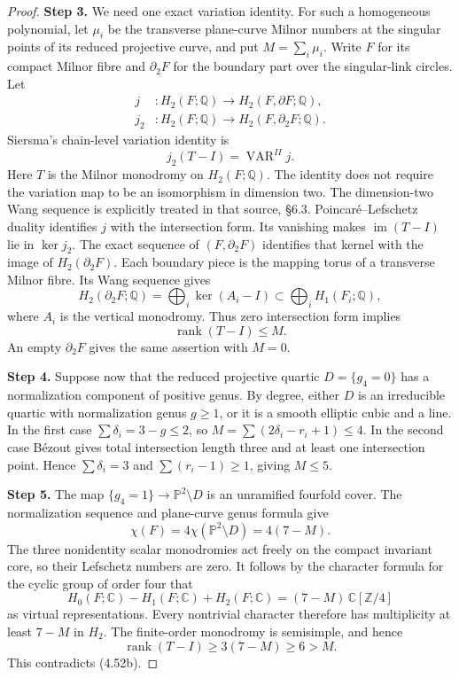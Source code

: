 \begin{proof}
\noindent\textbf{Step 3.} We need one exact variation identity. For such a
homogeneous polynomial, let $\mu_i$ be the
transverse plane-curve Milnor numbers at the
singular points of its reduced projective curve,
and put $M=\sum_i\mu_i$. Write $F$ for its compact
Milnor fibre and $\partial_2F$ for the boundary
part over the singular-link circles. Let
\[
 \begin{split}
 j&:H_2(F;\mathbb Q)\longrightarrow
                         H_2(F,\partial F;\mathbb Q),\\
 j_2&:H_2(F;\mathbb Q)\longrightarrow
                         H_2(F,\partial_2F;\mathbb Q).
 \end{split}
\]
Siersma's chain-level variation identity
\cite[\S3.6, pp.~451--452; \S7.1, p.~462]
{Siersma1991Variation} is
\[
                 j_2(T-I)=\operatorname{VAR}^{II}j.
                                                            \tag{4.52a}
\]
Here $T$ is the Milnor monodromy on $H_2(F;\mathbb Q)$.
The identity does not require the variation map to
be an isomorphism in dimension two. The dimension-two
Wang sequence is explicitly treated in that source,
\S6.3. Poincar\'e--Lefschetz duality identifies $j$
with the intersection form. Its vanishing makes
$\operatorname{im}(T-I)$ lie in $\ker j_2$.
The exact sequence of $(F,\partial_2F)$ identifies
that kernel with the image of $H_2(\partial_2F)$.
Each boundary piece is the mapping torus of a
transverse Milnor fibre. Its Wang sequence gives
\[
 H_2(\partial_2F;\mathbb Q)
       =\bigoplus_i\ker(A_i-I)\subset
                        \bigoplus_iH_1(F_i;\mathbb Q),
\]
where $A_i$ is the vertical monodromy. Thus zero
intersection form implies
\[
                 \operatorname{rank}(T-I)\le M.             \tag{4.52b}
\]
An empty $\partial_2F$ gives the same assertion with
$M=0$.

\noindent\textbf{Step 4.} Suppose now that the reduced projective quartic
$D=\{g_4=0\}$ has a normalization component of
positive genus. By degree, either $D$ is an
irreducible quartic with normalization genus
$g\ge1$, or it is a smooth elliptic cubic and a
line. In the first case
$\sum\delta_i=3-g\le2$, so
$M=\sum(2\delta_i-r_i+1)\le4$.
In the second case B\'ezout gives total intersection
length three and at least one intersection point.
Hence $\sum\delta_i=3$ and
$\sum(r_i-1)\ge1$, giving $M\le5$.

\noindent\textbf{Step 5.} The map $\{g_4=1\}\to\mathbb P^2\setminus D$ is
an unramified fourfold cover. The normalization
sequence and plane-curve genus formula give
\[
              \chi(F)=4\chi(\mathbb P^2\setminus D)
                      =4(7-M).
\]
The three nonidentity scalar monodromies act freely
on the compact invariant core, so their Lefschetz
numbers are zero. It follows by the character
formula for the cyclic group of order four that
\[
 H_0(F;\mathbb C)-H_1(F;\mathbb C)+H_2(F;\mathbb C)
       =(7-M)\,\mathbb C[\mathbb Z/4]
\]
as virtual representations. Every nontrivial
character therefore has multiplicity at least
$7-M$ in $H_2$. The finite-order monodromy is
semisimple, and hence
\[
             \operatorname{rank}(T-I)
                   \ge3(7-M)\ge6>M.                       \tag{4.52c}
\]
This contradicts (4.52b).


\end{proof}
